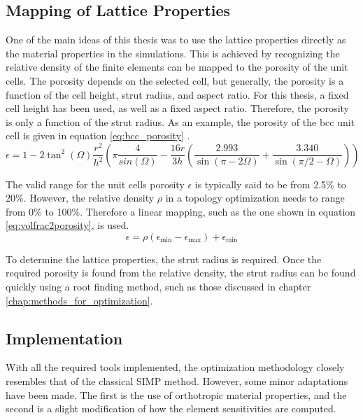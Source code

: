 \subsection*{Mapping of Lattice Properties}
One of the main ideas of this thesis was to use the lattice properties directly as the material properties in the simulations. This is achieved by recognizing the relative density of the finite elements can be mapped to the porosity of the unit cells. The porosity depends on the selected cell, but generally, the porosity is a function of the cell height, strut radius, and aspect ratio. For this thesis, a fixed cell height has been used, as well as a fixed aspect ratio. Therefore, the porosity is only a function of the strut radius. As an example, the porosity of the bcc unit cell is given in equation \ref{eq:bcc_porosity} \cite{Piacquadio_Soika_Schirp_Schröder_Filippeschi_2023}.
\begin{equation}
  \epsilon = 1-2\tan^2(\Omega)\frac{r^2}{h^2}\left(\pi\frac{4}{sin(\Omega)}-\frac{16r}{3h}\left(\frac{2.993}{\sin(\pi-2\Omega)}+\frac{3.340}{\sin(\pi/2-\Omega)}\right) \right)
  \label{eq:bcc_porosity}
\end{equation}

The valid range for the unit cells porosity $\epsilon$ is typically said to be from 2.5\% to 20\%. However, the relative density $\rho$ in a topology optimization needs to range from 0\% to 100\%. Therefore a linear mapping, such as the one shown in equation \ref{eq:volfrac2porosity}, is used.
\begin{equation}
  \epsilon = \rho(\epsilon_{\text{min}}-\epsilon_{\text{max}}) + \epsilon_{\text{min}}
  \label{eq:volfrac2porosity}
\end{equation}

To determine the lattice properties, the strut radius is required. Once the required porosity is found from the relative density, the strut radius can be found quickly using a root finding method, such as those discussed in chapter \ref{chap:methods_for_optimization}.

\subsection*{Implementation}
With all the required tools implemented, the optimization methodology closely resembles that of the classical SIMP method. However, some minor adaptations have been made. The first is the use of orthotropic material properties, and the second is a slight modification of how the element sensitivities are computed.

